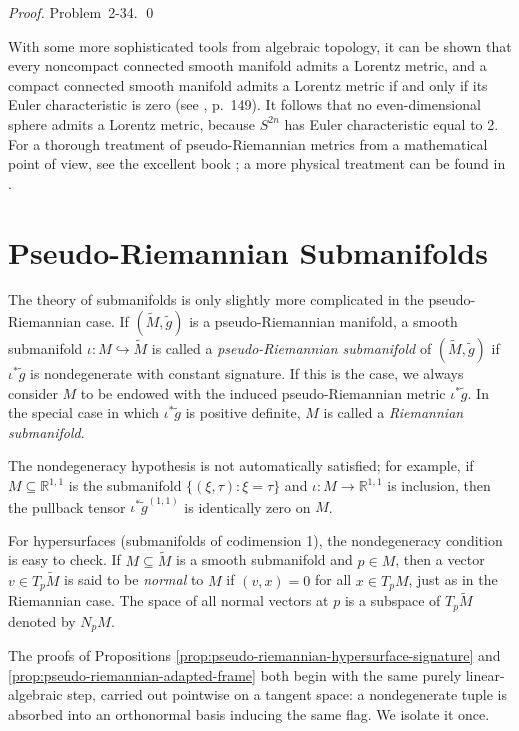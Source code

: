 \emph{Proof.} Problem~2-34. \qed

With some more sophisticated tools from algebraic topology, it can be shown that every noncompact connected smooth manifold admits a Lorentz metric, and a compact connected smooth manifold admits a Lorentz metric if and only if its Euler characteristic is zero (see \cite{ON83}, p.~149). It follows that no even-dimensional sphere admits a Lorentz metric, because $S^{2n}$ has Euler characteristic equal to 2. For a thorough treatment of pseudo-Riemannian metrics from a mathematical point of view, see the excellent book \cite{ON83}; a more physical treatment can be found in \cite{HE73}.

\section{Pseudo-Riemannian Submanifolds}

The theory of submanifolds is only slightly more complicated in the pseudo-Riemannian case. If $(\tilde{M}, \tilde{g})$ is a pseudo-Riemannian manifold, a smooth submanifold $\iota: M \hookrightarrow \tilde{M}$ is called a \emph{pseudo-Riemannian submanifold} of $(\tilde{M}, \tilde{g})$ if $\iota^* \tilde{g}$ is nondegenerate with constant signature. If this is the case, we always consider $M$ to be endowed with the induced pseudo-Riemannian metric $\iota^* \tilde{g}$. In the special case in which $\iota^* \tilde{g}$ is positive definite, $M$ is called a \emph{Riemannian submanifold}.

The nondegeneracy hypothesis is not automatically satisfied; for example, if $M \subseteq \mathbb{R}^{1,1}$ is the submanifold $\{(\xi, \tau) : \xi = \tau\}$ and $\iota: M \to \mathbb{R}^{1,1}$ is inclusion, then the pullback tensor $\iota^* \tilde{g}^{(1,1)}$ is identically zero on $M$.

For hypersurfaces (submanifolds of codimension 1), the nondegeneracy condition is easy to check. If $M \subseteq \tilde{M}$ is a smooth submanifold and $p \in M$, then a vector $v \in T_p \tilde{M}$ is said to be \emph{normal} to $M$ if $(v,x) = 0$ for all $x \in T_p M$, just as in the Riemannian case. The space of all normal vectors at $p$ is a subspace of $T_p \tilde{M}$ denoted by $N_p M$.

The proofs of Propositions \ref{prop:pseudo-riemannian-hypersurface-signature} and \ref{prop:pseudo-riemannian-adapted-frame} both begin with the same purely linear-algebraic step, carried out pointwise on a tangent space: a nondegenerate tuple is absorbed into an orthonormal basis inducing the same flag. We isolate it once.

